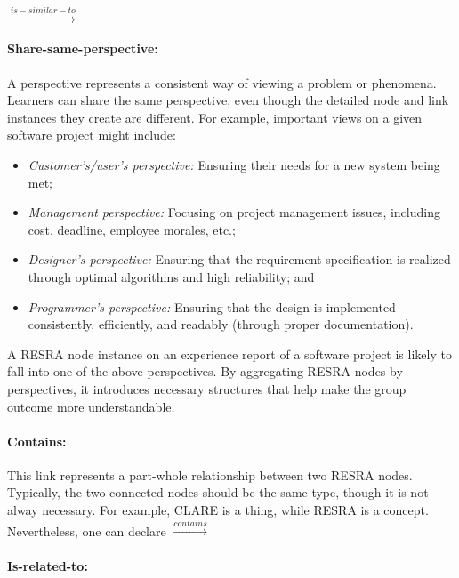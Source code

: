 \begin{itemize}
{\indent {} \(
  \stackrel{is-similar-to}{\longrightarrow} \) 

\paragraph{Share-same-perspective:}
  
A perspective represents a consistent way of viewing a problem or
phenomena. Learners can share the same perspective, even though the
detailed node and link instances they create are different. For example,
important views on a given software project might include:

\begin{itemize}
\item {\it Customer's/user's perspective:\/} Ensuring their needs for a new
  system being met;
  
\item {\it Management perspective:\/} Focusing on project management
  issues, including cost, deadline, employee morales, etc.;
  
\item {\it Designer's perspective:\/} Ensuring that the requirement
  specification is realized through optimal algorithms and high reliability;
  and
  
\item {\it Programmer's perspective:\/} Ensuring that the design is
  implemented consistently, efficiently, and readably (through proper
  documentation).
\end{itemize}

A RESRA node instance on an experience report of a software project is
likely to fall into one of the above perspectives. By aggregating RESRA
nodes by perspectives, it introduces necessary structures that help make
the group outcome more understandable.


\paragraph{Contains:}

This link represents a part-whole relationship between two RESRA nodes.
Typically, the two connected nodes should be the same type, though it is
not alway necessary. For example, CLARE is a {\sf thing\/}, while {\sf
RESRA\/} is a {\sf concept\/}. Nevertheless, one can declare  \( \stackrel{contains}{\longrightarrow} \) 

\paragraph{Is-related-to:}

}
\end{itemize}
